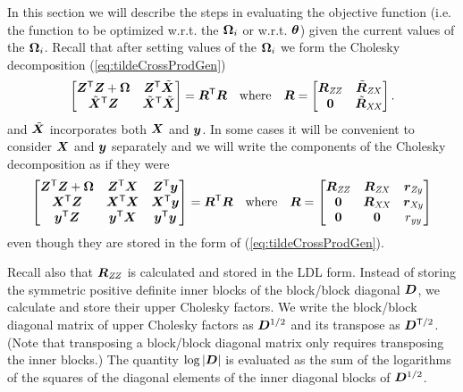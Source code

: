 \documentclass[12pt]{article}
\begin{document}
In this section we will describe the steps in evaluating the objective
function (i.e.{} the function to be optimized w.r.t.{} the $\bm{\Omega}_i$
or w.r.t.{} $\bm{\theta}$) given the current values of the $\bm{\Omega}_i$.
Recall that after setting values of the $\bm{\Omega}_i$ we form the
Cholesky decomposition (\ref{eq:tildeCrossProdGen})
\begin{equation*}
  \begin{bmatrix}
    \bm{Z}^\mathsf{T}\bm{Z}+\bm{\Omega} & \bm{Z}^\mathsf{T}\tilde{\bm{X}} \\
    \tilde{\bm{X}}^\mathsf{T}\bm{Z} & \tilde{\bm{X}}^\mathsf{T}\tilde{\bm{X}}
  \end{bmatrix}=\bm{R}^\mathsf{T}\bm{R}\quad\text{where}\quad\bm{R}=
  \begin{bmatrix}
    \bm{R}_\mathit{ZZ} & \tilde{\bm{R}}_\mathit{ZX}\\
    \bm{0}& \tilde{\bm{R}}_\mathit{XX}
  \end{bmatrix} .
\end{equation*}
and $\tilde{\bm{X}}$ incorporates both $\bm{X}$ and $\bm{y}$.  In some cases
it will be convenient to consider $\bm{X}$ and $\bm{y}$ separately and we will
write the components of the Cholesky decomposition as if they were
\begin{equation}
  \label{eq:CrossProdGen}
  \begin{bmatrix}
    \bm{Z}^\mathsf{T}\bm{Z}+\bm{\Omega} & \bm{Z}^\mathsf{T}\bm{X}  & \bm{Z}^\mathsf{T}\bm{y} \\
    \bm{X}^\mathsf{T}\bm{Z}         & \bm{X}^\mathsf{T}\bm{X}  & \bm{X}^\mathsf{T}\bm{y} \\
    \bm{y}^\mathsf{T}\bm{Z}         & \bm{y}^\mathsf{T}\bm{X}  & \bm{y}^\mathsf{T}\bm{y}
  \end{bmatrix}=\bm{R}^\mathsf{T}\bm{R}\quad\text{where}\quad\bm{R}=
  \begin{bmatrix}
    \bm{R}_\mathit{ZZ} & \bm{R}_\mathit{ZX} & \bm{r}_\mathit{Zy} \\
    \bm{0}    & \bm{R}_\mathit{XX} & \bm{r}_\mathit{Xy} \\
    \bm{0}    & \bm{0}    & r_\mathit{yy}
  \end{bmatrix}
\end{equation}
even though they are stored in the form of (\ref{eq:tildeCrossProdGen}).

Recall also that $\bm{R}_\mathit{ZZ}$ is calculated and stored in the LDL form.
Instead of storing the symmetric positive definite inner blocks of the
block/block diagonal $\bm{D}$, we calculate and store their upper
Cholesky factors.  We write the block/block diagonal matrix of upper
Cholesky factors as $\bm{D}^{1/2}$ and its transpose as
$\bm{D}^{\mathsf{T}/2}$.  (Note that transposing a block/block diagonal
matrix only requires transposing the inner blocks.)  The quantity
$\log\left|\bm{D}\right|$ is evaluated as the sum of the logarithms of
the squares of the diagonal elements of the inner diagonal blocks of
$\bm{D}^{1/2}$.
\end{document}
